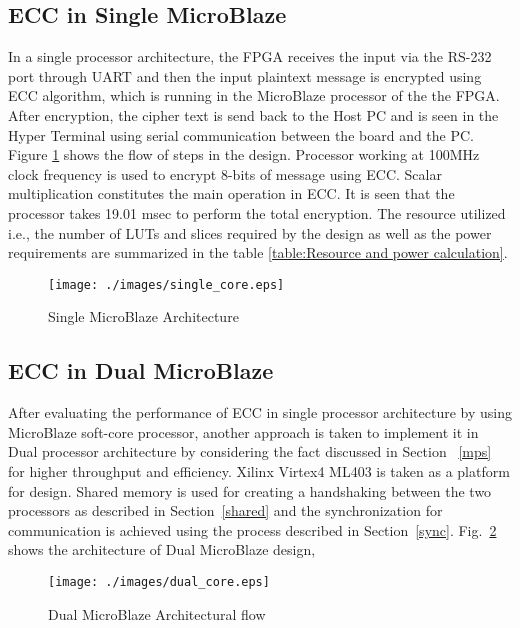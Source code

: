 \documentclass[preprint,12pt]{elsarticle}
\begin{document}
\subsection{ ECC in Single MicroBlaze}
In a single processor architecture, the FPGA receives the input via the RS-232 port through UART and then the input plaintext message is encrypted using ECC algorithm, which is running in the MicroBlaze processor of the the FPGA. After encryption, the cipher text is send back to the Host PC and is seen in the Hyper Terminal using serial communication between the board and the PC. Figure \ref{single} shows the flow of steps in the design. Processor working at 100MHz clock frequency is used to encrypt 8-bits of message using ECC.  Scalar multiplication constitutes the main operation in ECC. It is seen that the processor takes 19.01 msec to perform the total encryption. The resource utilized i.e., the number of LUTs and slices required by the design as well as the power requirements are summarized in the table \ref{table:Resource and power calculation}.
\begin{figure}[htbp]
\vspace{-40pt}
\centering
\texttt{[image: ./images/single\_core.eps]}
\caption{Single MicroBlaze Architecture}
\label{single}
\vspace{-14pt}
\end{figure}

\subsection{ ECC in Dual MicroBlaze}
After evaluating the performance of ECC in single processor architecture by using MicroBlaze  soft-core processor, another approach is taken to implement it in Dual processor architecture by considering the fact discussed in Section ~\ref{mps} for higher throughput and efficiency. Xilinx Virtex4 ML403 is taken as a platform for design. Shared memory is used for creating a handshaking between the two processors as described in Section~\ref{shared} and the synchronization for communication is achieved using the process described in Section~\ref{sync}. Fig.~\ref{dual} shows the architecture of Dual MicroBlaze design,
\begin{figure}[htbp]
\centering
\texttt{[image: ./images/dual\_core.eps]}
\caption{Dual MicroBlaze Architectural flow}
\label{dual}
\vspace{-12pt}
\end{figure}
\end{document}
